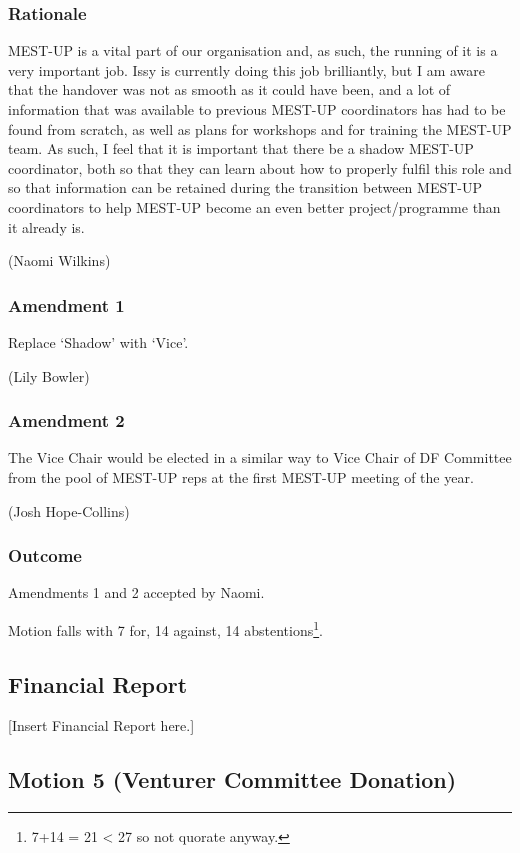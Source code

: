 \documentclass[a4paper, 11pt]{article} %
\begin{document}
\subsubsection{Rationale}

MEST-UP is a vital part of our organisation and, as such, the running of it is a very important job. Issy is currently doing this job brilliantly, but I am aware that the handover was not as smooth as it could have been, and a lot of information that was available to previous MEST-UP coordinators has had to be found from scratch, as well as plans for workshops and for training the MEST-UP team. As such, I feel that it is important that there be a shadow MEST-UP coordinator, both so that they can learn about how to properly fulfil this role and so that information can be retained during the transition between MEST-UP coordinators to help MEST-UP become an even better project/programme than it already is.

(Naomi Wilkins)

\subsubsection{Amendment 1}

Replace `Shadow' with `Vice'.

(Lily Bowler)

\subsubsection{Amendment 2}

The Vice Chair would be elected in a similar way to Vice Chair of DF Committee from the pool of MEST-UP reps at the first MEST-UP meeting of the year.

(Josh Hope-Collins)

\subsubsection{Outcome}

Amendments 1 and 2 accepted by Naomi.

Motion falls with 7 for, 14 against, 14 abstentions\footnote{7+14 = 21 < 27 so not quorate anyway.}.

\subsection{Financial Report}
[Insert Financial Report here.]

\subsection{Motion 5 (Venturer Committee Donation)}
\end{document}
